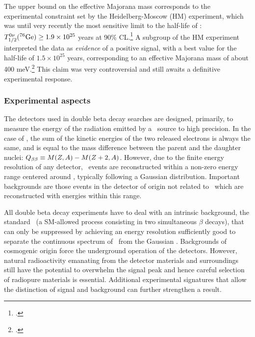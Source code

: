 The upper bound on the effective Majorana mass corresponds to the experimental constraint set by the Heidelberg-Moscow (HM) experiment, which was until very recently the most sensitive limit to the half-life of \bbonu: $T^{0\nu}_{1/2}({}^{76}\rm Ge) \ge 1.9\times10^{25}$ years at 90\% CL.\footcite{KlapdorKleingrothaus:2000sn}  A subgroup of the HM experiment interpreted the data as {\em evidence} of a positive signal, with a best value for the half-life of $1.5\times10^{25}$ years, corresponding to an effective Majorana mass of about 400 meV.\footcite{KlapdorKleingrothaus:2001ke} This claim  was very controversial and still awaits a definitive experimental response.


\subsubsection*{Experimental aspects}

The detectors used in double beta decay searches are designed, primarily, to measure the energy of the radiation emitted by a \bb\ source to high precision. In the case of \bbonu, the sum of the kinetic energies of the two released electrons is always the same, and is equal to the mass difference between the parent and the daughter nuclei: $Q_{\beta\beta} \equiv M(Z,A)-M(Z+2,A)$. However, due to the finite energy resolution of any detector, \bbonu\ events are reconstructed within a non-zero energy range centered around \Qbb, typically following a Gaussian distribution. Important backgrounds are those events in the detector of origin not related to \bbonu\ which are reconstructed with energies within this range.

All double beta decay experiments have to deal with an intrinsic background, the standard \bbtnu\ (a SM-allowed process consisting in two simultaneous $\beta$ decays), that can only be suppressed by achieving an energy resolution sufficiently good to separate the continuous spectrum of \bbtnu\ from the Gaussian \bbonu. Backgrounds of cosmogenic origin force the underground operation of the detectors. However, natural radioactivity emanating from the detector materials and surroundings still have the potential to overwhelm the signal peak and hence careful selection of radiopure materials is essential. Additional experimental signatures that allow the distinction of signal and background can further strengthen a result.

